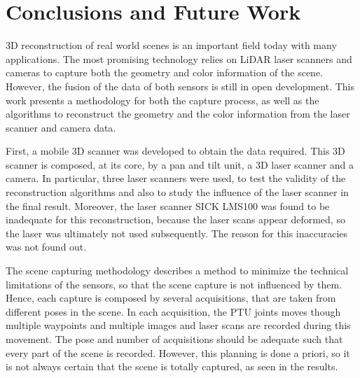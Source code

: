 \chapter{Conclusions and Future Work}
\label{section:conclusions-and-future-work}

\label{Conclusions}
\label{section:conclusions}

3D reconstruction of real world scenes is an important field today with many applications. The most promising technology relies on LiDAR laser scanners and cameras to capture both the geometry and color information of the scene. However, the fusion of the data of both sensors is still in open development. This work presents a methodology for both the capture process, as well as the algorithms to reconstruct the geometry and the color information from the laser scanner and camera data. 

First, a mobile 3D scanner was developed to obtain the data required. This 3D scanner is composed, at its core, by a pan and tilt unit, a 3D laser scanner and a camera. In particular, three laser scanners were used, to test the validity of the reconstruction algorithms and also to study the influence of the laser scanner in the final result. Moreover, the laser scanner SICK LMS100 was found to be inadequate for this reconstruction, because the laser scans appear deformed, so the laser was ultimately not used subsequently. The reason for this inaccuracies was not found out.

The scene capturing methodology describes a method to minimize the technical limitations of the sensors, so that the scene capture is not influenced by them. Hence, each capture is composed by several acquisitions, that are taken from different poses in the scene. In each acquisition, the PTU joints moves though multiple waypoints and multiple images and laser scans are recorded during this movement. The pose and number of acquisitions should be adequate such that every part of the scene is recorded. However, this planning is done a priori, so it is not always certain that the scene is totally captured, as seen in the results.

